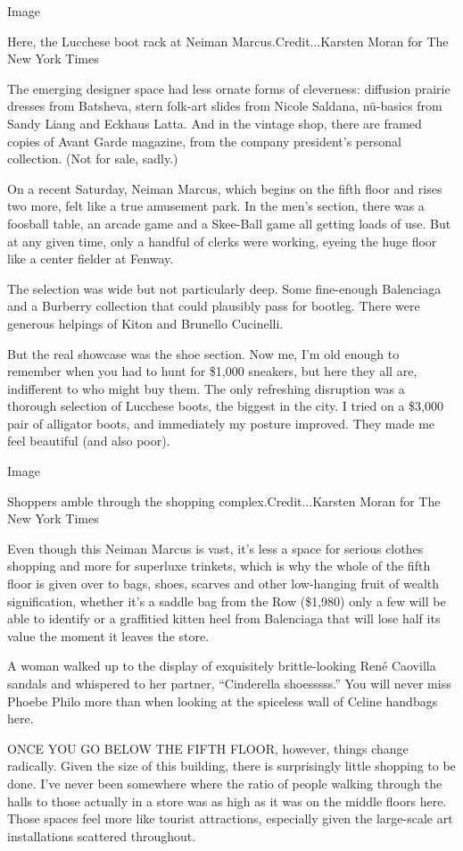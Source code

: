 Image

Here, the Lucchese boot rack at Neiman Marcus.Credit...Karsten Moran for
The New York Times

The emerging designer space had less ornate forms of cleverness:
diffusion prairie dresses from Batsheva, stern folk-art slides from
Nicole Saldana, nü-basics from Sandy Liang and Eckhaus Latta. And in the
vintage shop, there are framed copies of Avant Garde magazine, from the
company president's personal collection. (Not for sale, sadly.)

On a recent Saturday, Neiman Marcus, which begins on the fifth floor and
rises two more, felt like a true amusement park. In the men's section,
there was a foosball table, an arcade game and a Skee-Ball game all
getting loads of use. But at any given time, only a handful of clerks
were working, eyeing the huge floor like a center fielder at Fenway.

The selection was wide but not particularly deep. Some fine-enough
Balenciaga and a Burberry collection that could plausibly pass for
bootleg. There were generous helpings of Kiton and Brunello Cucinelli.

But the real showcase was the shoe section. Now me, I'm old enough to
remember when you had to hunt for \$1,000 sneakers, but here they all
are, indifferent to who might buy them. The only refreshing disruption
was a thorough selection of Lucchese boots, the biggest in the city. I
tried on a \$3,000 pair of alligator boots, and immediately my posture
improved. They made me feel beautiful (and also poor).

Image

Shoppers amble through the shopping complex.Credit...Karsten Moran for
The New York Times

Even though this Neiman Marcus is vast, it's less a space for serious
clothes shopping and more for superluxe trinkets, which is why the whole
of the fifth floor is given over to bags, shoes, scarves and other
low-hanging fruit of wealth signification, whether it's a saddle bag
from the Row (\$1,980) only a few will be able to identify or a
graffitied kitten heel from Balenciaga that will lose half its value the
moment it leaves the store.

A woman walked up to the display of exquisitely brittle-looking René
Caovilla sandals and whispered to her partner, ``Cinderella shoesssss.''
You will never miss Phoebe Philo more than when looking at the spiceless
wall of Celine handbags here.

ONCE YOU GO BELOW THE FIFTH FLOOR, however, things change radically.
Given the size of this building, there is surprisingly little shopping
to be done. I've never been somewhere where the ratio of people walking
through the halls to those actually in a store was as high as it was on
the middle floors here. Those spaces feel more like tourist attractions,
especially given the large-scale art installations scattered throughout.

